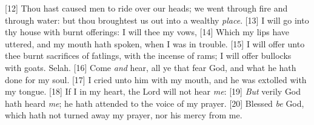 [12] \textcolor[cmyk]{0.99998,1,0,0}{Thou hast caused men to ride over our heads; we went through fire and through water: but thou broughtest us out into a wealthy \emph{place}.}
[13] \textcolor[cmyk]{0.99998,1,0,0}{I will go into thy house with burnt offerings: I will  thee my vows,}
[14] \textcolor[cmyk]{0.99998,1,0,0}{Which my lips have uttered, and my mouth hath spoken, when I was in trouble.}
[15] \textcolor[cmyk]{0.99998,1,0,0}{I will offer unto thee burnt sacrifices of fatlings, with the incense of rams; I will offer bullocks with goats. Selah.}
[16] \textcolor[cmyk]{0.99998,1,0,0}{Come \emph{and} hear, all ye that fear God, and  what he hath done for my soul.}
[17] \textcolor[cmyk]{0.99998,1,0,0}{I cried unto him with my mouth, and he was extolled with my tongue.}
[18] \textcolor[cmyk]{0.99998,1,0,0}{If I  in my heart, the Lord will not hear \emph{me}:}
[19] \textcolor[cmyk]{0.99998,1,0,0}{\emph{But} verily God hath heard \emph{me}; he hath attended to the voice of my prayer.}
[20] \textcolor[cmyk]{0.99998,1,0,0}{Blessed \emph{be} God, which hath not turned away my prayer, nor his mercy from me.}




